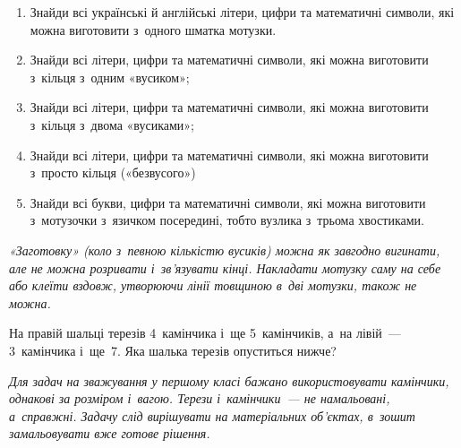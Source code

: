 \begin{enumerate}
  \item Знайди всі українські й англійські літери, цифри
  та математичні символи, які можна виготовити з~одного шматка мотузки.
  \item Знайди всі літери, цифри та математичні символи,
  які можна виготовити з~кільця з~одним «вусиком»;
  \item Знайди всі літери, цифри та математичні символи,
  які можна виготовити з~кільця з~двома «вусиками»;
  \item Знайди всі літери, цифри та математичні символи,
  які можна виготовити з~просто кільця («безвусого»)
  \item Знайди всі букви, цифри та математичні символи,
  які можна виготовити з~мотузочки з~язичком посередині,
  тобто вузлика з~трьома хвостиками.
\end{enumerate}

\emph{%
«Заготовку» (коло з~певною кількістю вусиків) можна як завгодно вигинати,
але не можна розривати і~зв'язувати кінці.
Накладати мотузку саму на себе або клеїти вздовж,
утворюючи лінії товщиною в~дві мотузки, також не можна.
}


\problem
На правій шальці терезів 4~камінчика і~ще 5~камінчиків,
а~на лівій~--- 3~камінчика і~ще~7.
Яка шалька терезів опуститься нижче?

\emph{%
Для задач на зважування у першому класі бажано використовувати
камінчики, однакові за розміром і~вагою.
Терези і~камінчики~--- не намальовані, а~справжні.
Задачу слід вирішувати на матеріальних об’єктах,
в~зошит замальовувати вже готове рішення.
}


